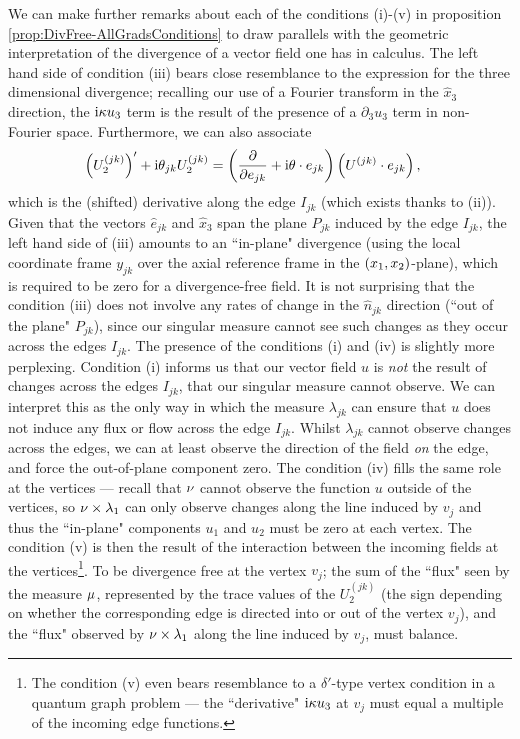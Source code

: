 We can make further remarks about each of the conditions (i)-(v) in proposition \ref{prop:DivFree-AllGradsConditions} to draw parallels with the geometric interpretation of the divergence of a vector field one has in calculus.
The left hand side of condition (iii) bears close resemblance to the expression for the three dimensional divergence; recalling our use of a Fourier transform in the $\widehat{x}_3$ direction, the $\mathrm{i}\kappa u_3$ term is the result of the presence of a $\partial_3 u_3$ term in non-Fourier space.
Furthermore, we can also associate
\begin{align*}
	\left( U_2^{(jk)} \right)' + \mathrm{i}\theta_{jk}U_2^{(jk)} &= \left( \dfrac{\partial }{\partial e_{jk}} + \mathrm{i}\theta\cdot e_{jk} \right)\left( U^{(jk)}\cdot e_{jk} \right),
\end{align*}
which is the (shifted) derivative along the edge $I_{jk}$ (which exists thanks to (ii)).
Given that the vectors $\widehat{e}_{jk}$ and $\widehat{x}_3$ span the plane $P_{jk}$ induced by the edge $I_{jk}$, the left hand side of (iii) amounts to an ``in-plane" divergence (using the local coordinate frame $y_{jk}$ over the axial reference frame in the $\left( x_1,x_2 \right)$-plane), which is required to be zero for a divergence-free field.
It is not surprising that the condition (iii) does not involve any rates of change in the $\hat{n}_{jk}$ direction (``out of the plane" $P_{jk}$), since our singular measure cannot see such changes as they occur across the edges $I_{jk}$.
The presence of the conditions (i) and (iv) is slightly more perplexing.
Condition (i) informs us that our vector field $u$ is \emph{not} the result of changes across the edges $I_{jk}$, that our singular measure cannot observe.
We can interpret this as the only way in which the measure $\lambda_{jk}$ can ensure that $u$ does not induce any flux or flow across the edge $I_{jk}$.
Whilst $\lambda_{jk}$ cannot observe changes across the edges, we can at least observe the direction of the field \emph{on} the edge, and force the out-of-plane component zero.
The condition (iv) fills the same role at the vertices --- recall that $\nu$ cannot observe the function $u$ outside of the vertices, so $\nu\times\lambda_1$ can only observe changes along the line induced by $v_j$ and thus the ``in-plane" components $u_1$ and $u_2$ must be zero at each vertex.
The condition (v) is then the result of the interaction between the incoming fields at the vertices\footnote{The condition (v) even bears resemblance to a $\delta'$-type vertex condition in a quantum graph problem --- the ``derivative" $\mathrm{i}\kappa u_3$ at $v_j$ must equal a multiple of the incoming edge functions.}.
To be divergence free at the vertex $v_j$; the sum of the ``flux" seen by the measure $\mu$, represented by the trace values of the $U_2^{(jk)}$ (the sign depending on whether the corresponding edge is directed into or out of the vertex $v_j$), and the ``flux" observed by $\nu\times\lambda_1$ along the line induced by $v_j$, must balance.

